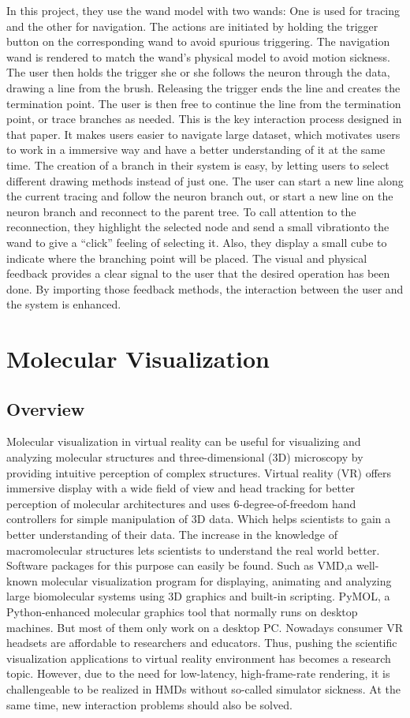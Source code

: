 \documentclass[10pt,twocolumn,letterpaper]{article}
\begin{document}
In this project, they use the wand model with two wands: One is used for tracing and the other for navigation. The actions are initiated by holding the trigger button on the corresponding wand to avoid spurious triggering. The navigation wand is rendered to match the wand’s physical model to avoid motion sickness. The user then holds the trigger she or she follows the neuron through the data, drawing a line from the brush. Releasing the trigger ends the line and creates the termination point. The user is then free to continue the line from the termination point, or trace branches as needed. This is the key interaction process designed in that paper. It makes users easier to navigate large dataset, which motivates users to work in a immersive way and have a better understanding of it at the same time. The creation of a branch in their system is easy, by letting users to select different drawing methods instead of just one. The user can start a new line along the current tracing and follow the neuron branch out, or start a new line on the neuron branch and reconnect to the parent tree. To call attention to the reconnection, they highlight the selected node and send a small vibrationto the wand to give a “click” feeling of selecting it. Also, they display a small cube to indicate where the branching point will be placed. The visual and physical feedback provides a clear signal to the user that the desired operation has been done. By importing those feedback methods, the interaction between the user and the system is enhanced.
\section{Molecular Visualization}
\subsection{Overview}
Molecular visualization in virtual reality can be useful for visualizing and analyzing molecular structures and three-dimensional (3D) microscopy by providing intuitive perception of complex structures. Virtual reality (VR) offers immersive display with a wide field of view and head tracking for better perception of molecular architectures and uses 6-degree-of-freedom hand controllers for simple manipulation of 3D data. Which helps scientists to gain a better understanding of their data. The increase in the knowledge of macromolecular structures lets scientists to understand the real world better. Software packages for this purpose can easily be found. Such as VMD,a well-known molecular visualization program for displaying, animating and analyzing large biomolecular systems using 3D graphics and built-in scripting. PyMOL, a Python-enhanced molecular graphics tool that normally runs on desktop machines. But most of them only work on a desktop PC. Nowadays consumer VR headsets are affordable to researchers and educators. Thus, pushing the scientific visualization applications to virtual reality environment has becomes a research topic. However, due to the need for low-latency, high-frame-rate rendering, it is challengeable to be realized in HMDs without so-called simulator sickness. At the same time, new interaction problems should also be solved.
\end{document}
